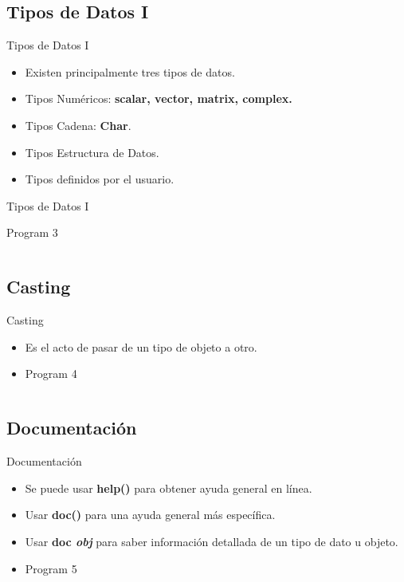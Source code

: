 \documentclass[usenames, dvipsnames, compress]{beamer}
\begin{document}
	\subsection{Tipos de Datos I}
	\begin{frame}{Tipos de Datos I}
		\begin{itemize}[<+- | alert@ +>]
			\item Existen principalmente tres tipos de datos.
			\item Tipos Numéricos: \textbf{scalar, vector, matrix, complex.}
			\item Tipos Cadena: \textbf{Char}.
			\item Tipos Estructura de Datos. 
			\item Tipos definidos por el usuario.
		\end{itemize}
	\end{frame}
	\begin{frame}{Tipos de Datos I}
		\begin{block}{Program 3}
			\inputminted[xleftmargin=\parindent,linenos]{python}{codes/program3.m}
		\end{block}
	\end{frame}
	\subsection{Casting}
	\begin{frame}{Casting}
		\begin{itemize}
			\item Es el acto de pasar de un tipo de objeto a otro.
			\pause
			\item[] \begin{block}{Program 4}
				\inputminted[xleftmargin=\parindent,linenos]{python}{codes/program4.m}
			\end{block} 
		\end{itemize}
	\end{frame}
	\subsection{Documentación}
	\begin{frame}{Documentación}
		\begin{itemize}
			\item Se puede usar \textbf{help()} para obtener ayuda general en línea.
			\pause
			\item Usar \textbf{doc()} para una ayuda general más específica.
			\pause
			\item Usar \textbf{doc \textit{obj}} para saber información detallada de un tipo de dato u objeto.
			\pause
			\item [] 
			\begin{block}{Program 5}
				\inputminted[xleftmargin=\parindent,linenos]{python}{codes/program5.m}
			\end{block}
		\end{itemize}
	\end{frame}
\end{document}
